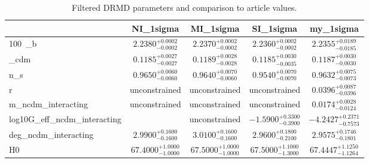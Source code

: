\begin{table}
\caption{Filtered DRMD parameters and comparison to article values.}
\label{tab:drmd_compare}
\begin{tabular}{lcccc}
\toprule
 & NI_1sigma & MI_1sigma & SI_1sigma & my_1sigma \\
\midrule
100~\omega{}_{b} & $2.2380^{+0.0002}_{-0.0002}$ & $2.2370^{+0.0002}_{-0.0002}$ & $2.2360^{+0.0002}_{-0.0002}$ & $2.2355^{+0.0189}_{-0.0185}$ \\
\omega{}_{cdm} & $0.1185^{+0.0027}_{-0.0027}$ & $0.1189^{+0.0028}_{-0.0028}$ & $0.1185^{+0.0030}_{-0.0035}$ & $0.1187^{+0.0030}_{-0.0030}$ \\
n_{s} & $0.9650^{+0.0060}_{-0.0060}$ & $0.9640^{+0.0070}_{-0.0060}$ & $0.9540^{+0.0070}_{-0.0070}$ & $0.9632^{+0.0075}_{-0.0073}$ \\
r & unconstrained & unconstrained & unconstrained & $0.0396^{+0.0087}_{-0.0396}$ \\
m_{ncdm_interacting} & unconstrained & unconstrained & unconstrained & $0.0174^{+0.0028}_{-0.0124}$ \\
log10G_{eff_ncdm_interacting} &  & unconstrained & $-1.5900^{+0.3300}_{-0.3900}$ & $-4.2427^{+0.2371}_{-0.7573}$ \\
deg_{ncdm_interacting} & $2.9900^{+0.1600}_{-0.1600}$ & $3.0100^{+0.1600}_{-0.1600}$ & $2.9600^{+0.1800}_{-0.2100}$ & $2.9575^{+0.1746}_{-0.1801}$ \\
H0 & $67.4000^{+1.0000}_{-1.0000}$ & $67.5000^{+1.0000}_{-1.0000}$ & $67.5000^{+1.1000}_{-1.3000}$ & $67.4447^{+1.1250}_{-1.1264}$ \\
\bottomrule
\end{tabular}
\end{table}

